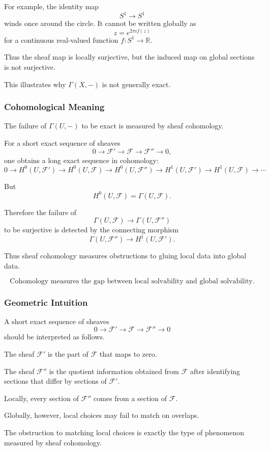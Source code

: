 \documentclass[12pt,a4paper]{article}
\newcommand{\F}{\mathcal F}
\theoremstyle{notespace}
\newcommand{\Fp}{\mathcal F'}      %
\newcommand{\Fpp}{\mathcal F''}
\begin{document}
For example, the identity map
\[
S^1\to S^1
\]
winds once around the circle. It cannot be written globally as
\[
z=e^{2\pi i f(z)}
\]
for a continuous real-valued function \(f:S^1\to \mathbb R\).

Thus the sheaf map is locally surjective, but the induced map on global sections is not surjective.

This illustrates why \(\Gamma(X,-)\) is not generally exact.

\subsubsection{Cohomological Meaning}

The failure of \(\Gamma(U,-)\) to be exact is measured by sheaf cohomology.

For a short exact sequence of sheaves
\[
0\to \Fp\to \F\to \Fpp\to 0,
\]
one obtains a long exact sequence in cohomology:
\[
0\to H^0(U,\Fp)
\to H^0(U,\F)
\to H^0(U,\Fpp)
\to H^1(U,\Fp)
\to H^1(U,\F)
\to \cdots
\]

But
\[
H^0(U,\F)=\Gamma(U,\F).
\]

Therefore the failure of
\[
\Gamma(U,\F)\to \Gamma(U,\Fpp)
\]
to be surjective is detected by the connecting morphism
\[
\Gamma(U,\Fpp)\to H^1(U,\Fp).
\]

Thus sheaf cohomology measures obstructions to gluing local data into global data.

\[
\boxed{
	\text{Cohomology measures the gap between local solvability and global solvability.}
}
\]

\subsubsection{Geometric Intuition}

A short exact sequence of sheaves
\[
0\to \Fp\to \F\to \Fpp\to 0
\]
should be interpreted as follows.

The sheaf \(\Fp\) is the part of \(\F\) that maps to zero.

The sheaf \(\Fpp\) is the quotient information obtained from \(\F\) after identifying sections that differ by sections of \(\Fp\).

Locally, every section of \(\Fpp\) comes from a section of \(\F\).

Globally, however, local choices may fail to match on overlaps.

The obstruction to matching local choices is exactly the type of phenomenon measured by sheaf cohomology.
\end{document}
